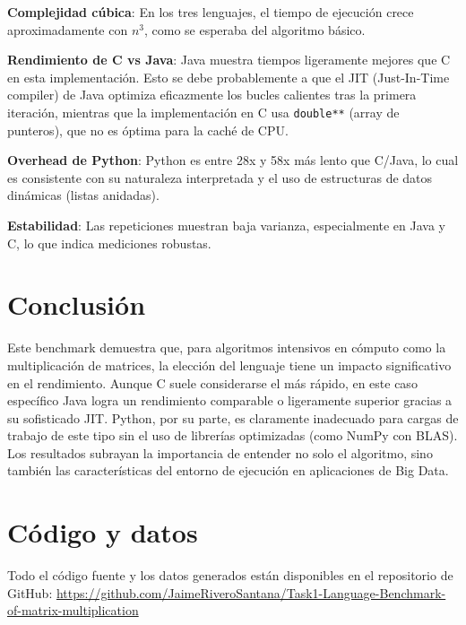 \documentclass[12pt]{article}
\begin{document}
\item \textbf{Complejidad cúbica}: En los tres lenguajes, el tiempo de ejecución crece aproximadamente con \(n^3\), como se esperaba del algoritmo básico.
    
    \item \textbf{Rendimiento de C vs Java}: Java muestra tiempos ligeramente mejores que C en esta implementación. Esto se debe probablemente a que el JIT (Just-In-Time compiler) de Java optimiza eficazmente los bucles calientes tras la primera iteración, mientras que la implementación en C usa \texttt{double**} (array de punteros), que no es óptima para la caché de CPU.
    
    \item \textbf{Overhead de Python}: Python es entre 28x y 58x más lento que C/Java, lo cual es consistente con su naturaleza interpretada y el uso de estructuras de datos dinámicas (listas anidadas).
    
    \item \textbf{Estabilidad}: Las repeticiones muestran baja varianza, especialmente en Java y C, lo que indica mediciones robustas.

\section{Conclusión}
Este benchmark demuestra que, para algoritmos intensivos en cómputo como la multiplicación de matrices, la elección del lenguaje tiene un impacto significativo en el rendimiento. Aunque C suele considerarse el más rápido, en este caso específico Java logra un rendimiento comparable o ligeramente superior gracias a su sofisticado JIT. Python, por su parte, es claramente inadecuado para cargas de trabajo de este tipo sin el uso de librerías optimizadas (como NumPy con BLAS). Los resultados subrayan la importancia de entender no solo el algoritmo, sino también las características del entorno de ejecución en aplicaciones de Big Data.

\section*{Código y datos}
Todo el código fuente y los datos generados están disponibles en el repositorio de GitHub:  
\url{https://github.com/JaimeRiveroSantana/Task1-Language-Benchmark-of-matrix-multiplication}
\end{document}

